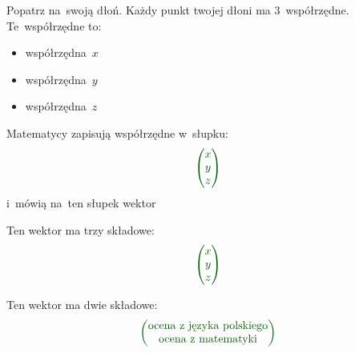 \documentclass{beamer}
\begin{document}
  \begin{frame}
    Popatrz na~swoją dłoń. Każdy punkt twojej dłoni ma 3~współrzędne.
    Te~współrzędne to:
    \begin{itemize}
      \item współrzędna~$x$
      \item współrzędna~$y$
      \item współrzędna~$z$
    \end{itemize}
  \end{frame}

  \begin{frame}
    Matematycy zapisują współrzędne w~słupku:
    $$\g
    \begin{pmatrix}
      x \\
      y \\
      z
    \end{pmatrix}
    $$
    i~mówią na~ten słupek {\g wektor}
  \end{frame}

  \begin{frame}
    Ten wektor ma trzy {\g składowe}:
    $$\g
    \begin{pmatrix}
      x \\
      y \\
      z
    \end{pmatrix}
    $$
  \end{frame}

  \begin{frame}
    Ten wektor ma dwie składowe:
    $$\g
    \begin{pmatrix}
      \hbox{ocena z~języka polskiego} \\
      \hbox{ocena z~matematyki}
    \end{pmatrix}
    $$
  \end{frame}
\end{document}
